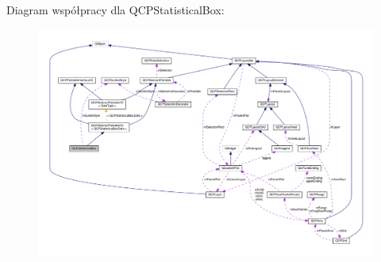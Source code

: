Diagram współpracy dla Q\+C\+P\+Statistical\+Box\+:\nopagebreak
\begin{figure}[H]
\begin{center}
\leavevmode
\includegraphics[width=350pt]{class_q_c_p_statistical_box__coll__graph}
\end{center}
\end{figure}
